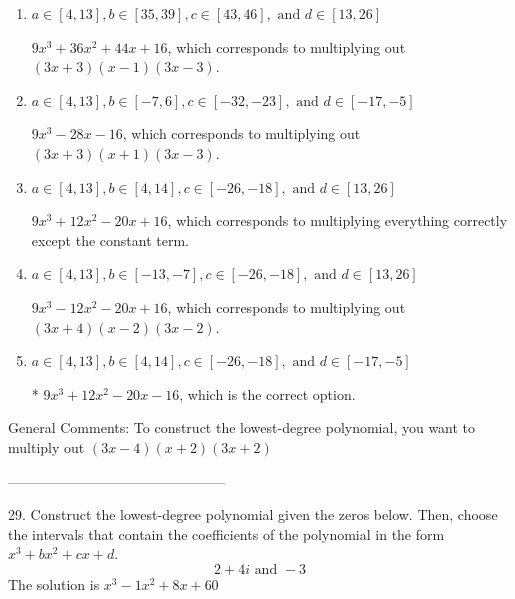\documentclass{article}[14pt]
\begin{document}
\begin{enumerate}[label=\Alph*.] 
\item $ a \in [4, 13], b \in [35, 39], c \in [43, 46], \text{ and } d \in [13, 26] $ 

 $9x^{3} +36 x^{2} +44 x + 16$, which corresponds to multiplying out $(3x + 3)(x -1)(3x -3)$. 
\item $ a \in [4, 13], b \in [-7, 6], c \in [-32, -23], \text{ and } d \in [-17, -5] $ 

 $9x^{3} -28 x -16$, which corresponds to multiplying out $(3x + 3)(x + 1)(3x -3)$. 
\item $ a \in [4, 13], b \in [4, 14], c \in [-26, -18], \text{ and } d \in [13, 26] $ 

 $9x^{3} +12 x^{2} -20 x + 16$, which corresponds to multiplying everything correctly except the constant term. 
\item $ a \in [4, 13], b \in [-13, -7], c \in [-26, -18], \text{ and } d \in [13, 26] $ 

 $9x^{3} -12 x^{2} -20 x + 16$, which corresponds to multiplying out $(3x + 4)(x -2)(3x -2)$. 
\item $ a \in [4, 13], b \in [4, 14], c \in [-26, -18], \text{ and } d \in [-17, -5] $ 

 * $9x^{3} +12 x^{2} -20 x -16$, which is the correct option. 
\end{enumerate} 
 
General Comments: To construct the lowest-degree polynomial, you want to multiply out $(3x -4)(x + 2)(3x + 2)$

-----------------------------------------------

29. Construct the lowest-degree polynomial given the zeros below. Then, choose the intervals that contain the coefficients of the polynomial in the form $x^3+bx^2+cx+d$.
$$ 2 + 4i \text{ and } -3 $$ 
The solution is $ x^{3} -1 x^{2} +8 x + 60 $ 
\end{document}
